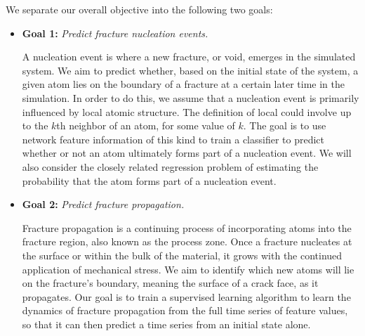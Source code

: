 We separate our overall objective into the following two goals:

\begin{itemize}
\item \textbf{Goal 1:} \emph{Predict fracture nucleation events.} 

A nucleation event is where a new fracture, or void, emerges in the simulated system.  We aim to predict whether, based on the initial state of the system, a given atom lies on the boundary of a fracture at a certain later time in the simulation.  In order to do this, we assume that a nucleation event is primarily influenced by local atomic structure.  The definition of local could involve up to the $k$th neighbor of an atom, for some value of $k$.  The goal is to use network feature information of this kind to train a classifier to predict whether or not an atom ultimately forms part of a nucleation event.  We will also consider the closely related regression problem of estimating the probability that the atom forms part of a nucleation event.

\item \textbf{Goal 2:} \emph{Predict fracture propagation.} 

Fracture propagation is a continuing process of incorporating atoms into the fracture region, also known as the process zone.
Once a fracture nucleates at the surface or within the bulk of the material, it grows with the continued application of mechanical stress.  We aim to identify which new atoms will lie on the fracture's boundary, meaning the surface of a crack face, as it propagates.  Our goal is to train a supervised learning algorithm to learn the dynamics of fracture propagation from the full time series of feature values, so that it can then predict a time series from an initial state alone.
\end{itemize}




